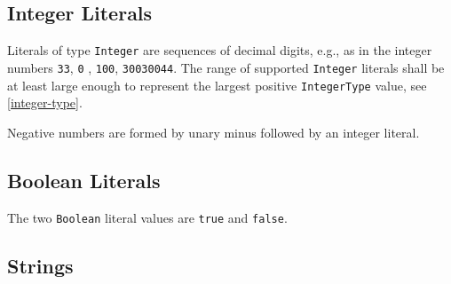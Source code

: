 \subsection{Integer Literals}\label{integer-literals}

Literals of type \lstinline!Integer! are sequences of decimal digits, e.g., as in the integer numbers \lstinline!33!,
\ifpdf
\lstinline!0!%
%
\fi
, \lstinline!100!, \lstinline!30030044!.
The range of supported \lstinline!Integer! literals shall be at least large enough to represent the largest positive \lstinline!IntegerType! value, see \cref{integer-type}.

\begin{nonnormative}
Negative numbers are formed by unary minus followed by an integer literal.
\end{nonnormative}


\subsection{Boolean Literals}\label{boolean-literals}

The two \lstinline!Boolean! literal values are \lstinline!true! and \lstinline!false!.


\subsection{Strings}\label{strings}

